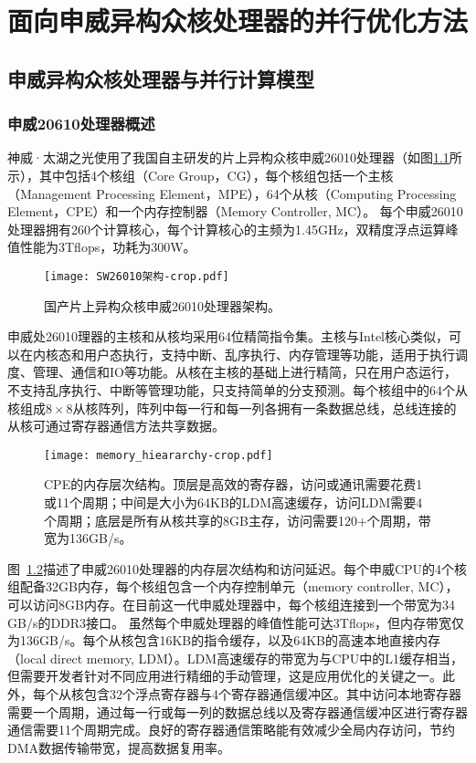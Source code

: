 \chapter{面向申威异构众核处理器的并行优化方法} %
\label{cha:面向申威异构众核处理器的并行优化方法}

\section{申威异构众核处理器与并行计算模型} %

\subsection{申威20610处理器概述} %
\label{sub:申威20610处理器概述}

神威·太湖之光使用了我国自主研发的片上异构众核申威26010处理器（如图\ref{fig:sunwaycpu}所示），其中包括4个核组（Core Group，CG）\citep {fu2016sunway}，每个核组包括一个主核（Management Processing Element，MPE），64个从核（Computing Processing Element，CPE）和一个内存控制器（Memory Controller, MC）。 每个申威26010处理器拥有260个计算核心，每个计算核心的主频为1.45GHz，双精度浮点运算峰值性能为3Tflops，功耗为300W。

\begin{figure}[ht]
\centering
\texttt{[image: SW26010架构-crop.pdf]}
\caption{国产片上异构众核申威26010处理器架构。}
\label{fig:sunwaycpu}
\end{figure}

申威处26010理器的主核和从核均采用64位精简指令集。主核与Intel核心类似，可以在内核态和用户态执行，支持中断、乱序执行、内存管理等功能，适用于执行调度、管理、通信和IO等功能。从核在主核的基础上进行精简，只在用户态运行，不支持乱序执行、中断等管理功能，只支持简单的分支预测。每个核组中的64个从核组成$8\times8$从核阵列，阵列中每一行和每一列各拥有一条数据总线，总线连接的从核可通过寄存器通信方法共享数据。

\begin{figure}[ht]
\centering
\texttt{[image: memory\_hieararchy-crop.pdf]}
\caption{CPE的内存层次结构。顶层是高效的寄存器，访问或通讯需要花费1或11个周期；中间是大小为64KB的LDM高速缓存，访问LDM需要4个周期；底层是所有从核共享的8GB主存，访问需要120+个周期，带宽为136GB/s。}
\label{fig:sunway_mem}
\end{figure}

图~\ref {fig:sunway_mem}描述了申威26010处理器的内存层次结构和访问延迟。每个申威CPU的4个核组配备32GB内存，每个核组包含一个内存控制单元（memory controller, MC），可以访问8GB内存。在目前这一代申威处理器中，每个核组连接到一个带宽为34 GB/s的DDR3接口。 虽然每个申威处理器的峰值性能可达3Tflops，但内存带宽仅为136GB/s。每个从核包含16KB的指令缓存，以及64KB的高速本地直接内存（local direct memory, LDM）。LDM高速缓存的带宽为与CPU中的L1缓存相当，但需要开发者针对不同应用进行精细的手动管理，这是应用优化的关键之一。此外，每个从核包含32个浮点寄存器与4个寄存器通信缓冲区。其中访问本地寄存器需要一个周期，通过每一行或每一列的数据总线以及寄存器通信缓冲区进行寄存器通信需要11个周期完成。良好的寄存器通信策略能有效减少全局内存访问，节约DMA数据传输带宽，提高数据复用率。

